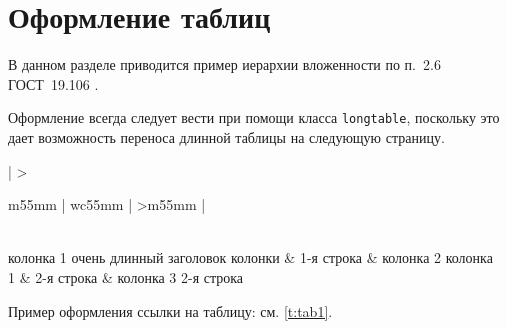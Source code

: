 \section{Оформление таблиц}

В данном разделе приводится пример иерархии вложенности по п.~2.6 ГОСТ~19.106 \cite{gost19106}.

Оформление всегда следует вести при помощи класса \lstinline|longtable|, поскольку это дает возможность переноса длинной таблицы на следующую страницу.

\begin{longtable}{| >{\raggedright}m{55mm} | wc{55mm} | >{\raggedleft}m{55mm} |}
	\caption{Пример организации длинной таблицы}
	\label{t:tab1} \\
	\hline
	колонка 1 очень  длинный заголовок колонки & 1-я строка & колонка 2 \tabularnewline
	\hline
	колонка \\ 1 & 2-я строка & колонка 3 2-я строка
	\tabularnewline\hline
\end{longtable}

Пример оформления ссылки на таблицу: см. \ref{t:tab1}.

%
